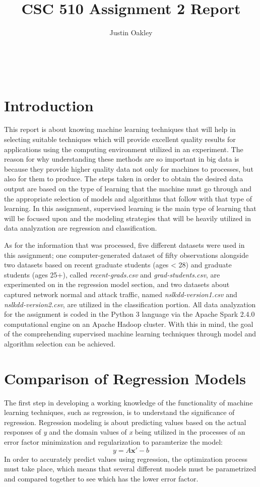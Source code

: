 \documentclass[a4paper,12pt]{IEEEtran}
\begin{document}
\title{CSC 510 Assignment 2 Report}
\author{Justin Oakley}
\maketitle\

\tableofcontents
\newpage

\section{Introduction}
This report is about knowing machine learning techniques that will help in selecting suitable techniques which will provide excellent quality results for applications using the computing environment utilized in an experiment. The reason for why understanding these methods are so important in big data is because they provide higher quality data not only for machines to processes, but also for them to produce. The steps taken in order to obtain the desired data output are based on the type of learning that the machine must go through and the appropriate selection of models and algorithms that follow with that type of learning. In this assignment, supervised learning is the main type of learning that will be focused upon and the modeling strategies that will be heavily utilized in data analyzation are regression and classification.

As for the information that was processed, five different datasets were used in this assignment; one computer-generated dataset of fifty observations alongside two datasets based on recent graduate students (ages < 28) and graduate students (ages 25+), called \textit{recent-grads.csv} and \textit{grad-students.csv}, are experimented on in the regression model section, and two datasets about captured network normal and attack traffic, named \textit{nslkdd-version1.csv} and \textit{nslkdd-version2.csv}, are utilized in the classification portion. All data analyzation for the assignment is coded in the Python 3 language via the Apache Spark 2.4.0 computational engine on an Apache Hadoop cluster. With this in mind, the goal of the comprehending supervised machine learning techniques through model and algorithm selection can be achieved.

\section{Comparison of Regression Models}
The first step in developing a working knowledge of the functionality of machine learning techniques, such as regression, is to understand the significance of regression. Regression modeling is about predicting values based on the actual responses of \textit{y} and the domain values of \textit{x} being utilized in the processes of an error factor minimization and regularization to paramterize the model:  \[\textit{y} = \textit{A}\textbf{x}' - \textit{b}\] In order to accurately predict values using regression, the optimization process must take place, which means that several different models must be parametrized and compared together to see which has the lower error factor.
\end{document}

